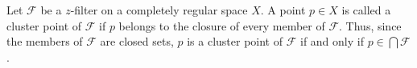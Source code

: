 Let $\mathcal{F}$ be a $z$-filter on a completely regular space $X$. A point $p \in X$ is called a cluster point of $\mathcal{F}$ if $p$ belongs to the closure of every member of $\mathcal{F}$. Thus, since the members of $\mathcal{F}$ are closed sets, $p$ is a cluster point of $\mathcal{F}$ if and only if $p \in \bigcap \mathcal{F}$.
